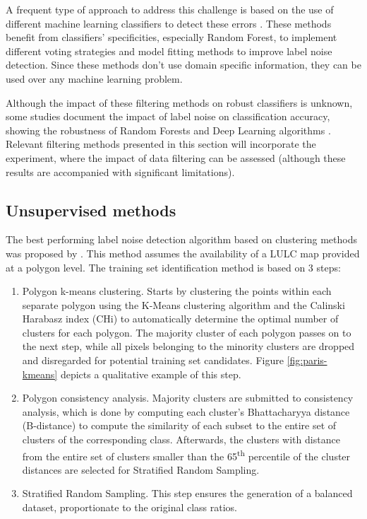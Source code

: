 \documentclass[12pt, english, openany]{book}
\begin{document}
A frequent type of approach to address this challenge is based on the use of
different machine learning classifiers to detect these errors
\cite{Brodley1999, Jiang2004, Liu2008, Yuan2018, Zhang2018,
Pelletier2017Filtering, Garcia-Gil2019, Boukir2019, Zhang2019}. These methods
benefit from classifiers' specificities, especially Random Forest, to implement
different voting strategies and model fitting methods to improve label noise
detection. Since these methods don't use domain specific information, they can
be used over any machine learning problem.

Although the impact of these filtering methods on robust classifiers is
unknown, some studies document the impact of label noise on classification
accuracy, showing the robustness of Random Forests and Deep Learning algorithms
\cite{Pelletier2017Effect, Rolnick2017}. Relevant filtering methods presented
in this section will incorporate the experiment, where the impact of data
filtering can be assessed (although these results are accompanied with
significant limitations).

\subsection*{Unsupervised methods}

The best performing label noise detection algorithm based on clustering methods
was proposed by \cite{Paris2019}. This method assumes the availability of a
LULC map provided at a polygon level. The training set identification method is
based on 3 steps:
\begin{enumerate}
  \item Polygon k-means clustering. Starts by clustering the points within each
  separate polygon using the K-Means clustering algorithm and the Calinski
  Harabasz index (CHi) to automatically determine the optimal number of
  clusters for each polygon. The majority cluster of each polygon passes on to
  the next step, while all pixels belonging to the minority clusters are
  dropped and disregarded for potential training set candidates. Figure
  \ref{fig:paris-kmeans} depicts a qualitative example of this step.

  \item Polygon consistency analysis. Majority clusters are submitted to
  consistency analysis, which is done by computing each cluster's Bhattacharyya
  distance (B-distance) to compute the similarity of each subset to the entire
  set of clusters of the corresponding class. Afterwards, the clusters with
  distance from the entire set of clusters smaller than the
  65\textsuperscript{th} percentile of the cluster distances are selected for
  Stratified Random Sampling.

  \item Stratified Random Sampling. This step ensures the generation of a
  balanced dataset, proportionate to the original class ratios.
\end{enumerate}
\end{document}

